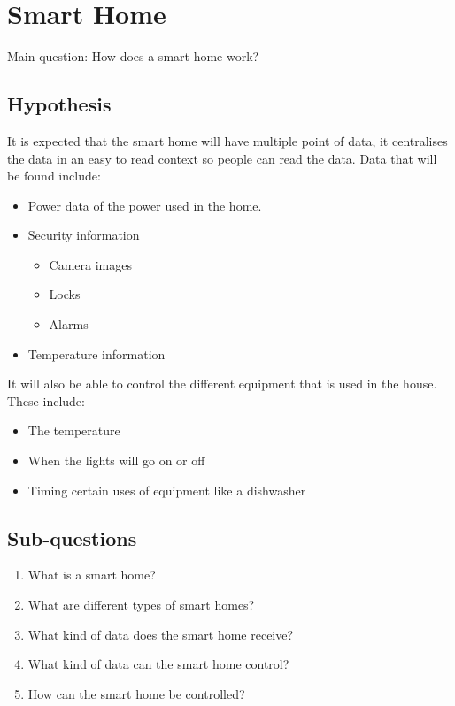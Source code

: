 \section{Smart Home}
Main question: How does a smart home work?

\subsection{Hypothesis}
It is expected that the smart home will have multiple point of data, it centralises the data in an easy to read context so people can read the data. Data that will be found include: 
\begin{itemize}
    \item Power data of the power used in the home.
    \item Security information
    \begin{itemize}
        \item Camera images
        \item Locks
        \item Alarms
    \end{itemize}
    \item Temperature information
\end{itemize}
It will also be able to control the different equipment that is used in the house. These include:
\begin{itemize}
    \item The temperature
    \item When the lights will go on or off
    \item Timing certain uses of equipment like a dishwasher
\end{itemize}

\subsection{Sub-questions}
\begin{enumerate}
    \item What is a smart home?
    \item What are different types of smart homes?
    \item What kind of data does the smart home receive?
    \item What kind of data can the smart home control?
    \item How can the smart home be controlled?
\end{enumerate}

